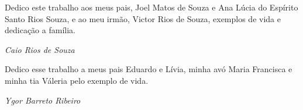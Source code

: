 \null
\vfill

Dedico este trabalho aos meus pais, Joel Matos de Souza e Ana Lúcia do Espírito Santo Rios Souza, e ao meu irmão, Victor Rios de Souza, exemplos de vida e dedicação a família.
\begin{flushright}
\textit{Caio Rios de Souza}
\end{flushright}

Dedico esse trabalho a meus pais Eduardo e Lívia, minha avó Maria Francisca e minha tia Váleria pelo exemplo de vida.
\begin{flushright}
\textit{Ygor Barreto Ribeiro}
\end{flushright}
